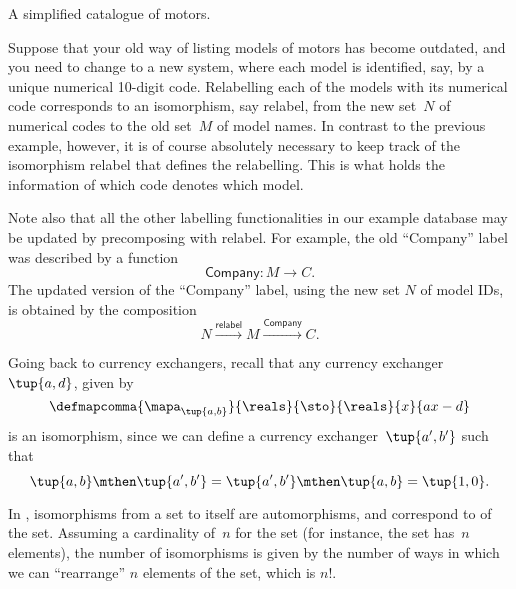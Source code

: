 \begin{example}[Relabelling]
\begin{table*}[h]
        \caption{
            A simplified catalogue of motors.
        }
        \label{tab:electric_motors}
    \end{table*}
    Suppose that your old way of listing models of motors has become outdated, and you need to change to a new system, where each model is identified, say, by a unique numerical 10-digit code.
    Relabelling each of the models with its numerical code corresponds to an isomorphism, say \textsf{relabel}, from the new set~$N$ of numerical codes to the old set~$M$ of model names.
    In contrast to the previous example, however, it is of course absolutely necessary to keep track of the isomorphism \textsf{relabel} that defines the relabelling.
    This is what holds the information of which code denotes which model.

    Note also that all the other labelling functionalities in our example database may be updated by precomposing with \textsf{relabel}.
    For example, the old ``Company'' label was described by a function
    \begin{equation}
        \textsf{Company}\colon M \to C.
    \end{equation}
    The updated version of the ``Company'' label, using the new set $N$ of model IDs, is obtained by the composition
    \begin{equation}
        N \overset{\textsf{relabel}}{\longrightarrow} M \overset{\textsf{Company}}{\longrightarrow} C.
    \end{equation}
\end{example}

\begin{example}
    Going back to currency exchangers, recall that any currency exchanger~$\tup{a,d}$, given by
    \begin{equation}
        \defmapcomma{
            \mapa_{\tup{a,b}}
        }{
            \reals
        }{
            \sto
        }{
            \reals
        }{
            x
        }{
            ax-d
        }
    \end{equation}
    is an isomorphism, since we can define a currency exchanger~$\tup{a',b'}$ such that
    \begin{equation}
        \tup{a,b}\mthen \tup{a',b'}=\tup{a',b'}\mthen \tup{a,b}=\tup{1,0}.
    \end{equation}
\end{example}

\begin{example}
    In \FinSet, isomorphisms from a set to itself are automorphisms, and correspond to \emph{} of the set.
    Assuming a cardinality of~$n$ for the set (for instance, the set has~$n$ elements), the number of isomorphisms is given by the number of ways in which we can ``rearrange'' $n$ elements of the set, which is $n!
    $.
\end{example}

